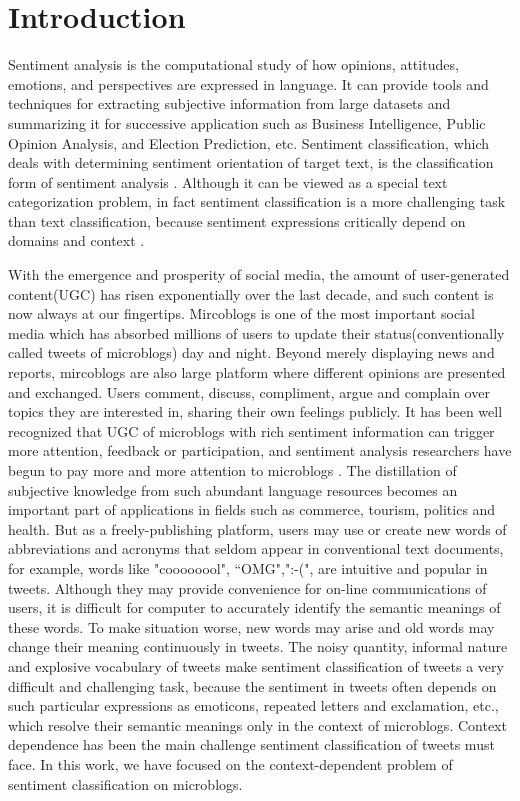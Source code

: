 \documentclass{llncs}
\begin{document}
\section{Introduction}
\label{intro}

Sentiment analysis is the computational study of how opinions, attitudes, emotions, and perspectives are expressed in language. 
It can provide tools and techniques for extracting subjective information from large datasets and summarizing it for successive application such as Business Intelligence, Public Opinion Analysis, and Election Prediction, etc. \cite{xsongx:b1} 
Sentiment classification, which deals with determining sentiment orientation of target text, is the classification form of sentiment analysis \cite{xsongx:b2}. 
Although it can be viewed as a special text categorization problem, in fact sentiment classification is a more challenging task than text classification, because sentiment expressions critically depend on domains and context \cite{xsongx:b6}.

With the emergence and prosperity of social media, the amount of user-generated content(UGC) has risen exponentially over the last decade, and such content is now always at our fingertips.
Mircoblogs is one of the most important social media which has absorbed millions of users to update their status(conventionally called tweets of microblogs) day and night.
Beyond merely displaying news and reports, mircoblogs are also large platform where different opinions are presented and exchanged. 
Users comment, discuss, compliment, argue and complain over topics they are interested in, sharing their own feelings publicly. 
It has been well recognized that UGC of microblogs with rich sentiment information can trigger more attention, feedback or participation, and sentiment analysis researchers have begun to pay more and more attention to microblogs \cite{DBLP:conf/hicss/StieglitzD12}.
The distillation of subjective knowledge from such abundant language resources becomes an important part of applications in fields such as commerce, tourism, politics and health. 
But as a freely-publishing platform, users may use or create new words of abbreviations and acronyms that seldom appear in conventional text documents, for example, words like "coooooool", “OMG",":-(", are intuitive and popular in tweets.
Although they may provide convenience for on-line communications of users, it is difficult for computer to accurately identify the semantic meanings of these words. 
To make situation worse, new words may arise and old words may change their meaning continuously in tweets.
The noisy quantity, informal nature and explosive vocabulary of tweets make sentiment classification of tweets a very difficult and challenging task, because the sentiment in tweets often depends on such particular expressions as emoticons, repeated letters and exclamation, etc., which resolve their semantic meanings only in the context of microblogs. 
Context dependence has been the main challenge sentiment classification of tweets must face.
In this work, we have focused on the context-dependent problem of sentiment classification on microblogs. 
\end{document}
